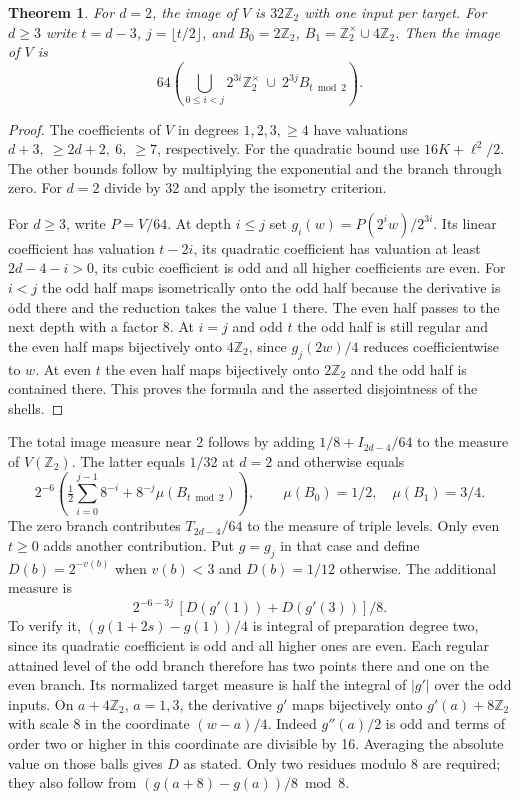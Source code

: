 \documentclass[11pt]{article}
\newtheorem{theorem}{Theorem}
\newcommand{\Z}{\mathbb Z_2}
\newcommand{\U}{\mathbb Z_2^\times}
\begin{document}
\begin{theorem}
For $d=2$, the image of $V$ is $32\Z$ with one input per target. For $d\ge3$ write $t=d-3$, $j=\lfloor t/2\rfloor$, and $B_0=2\Z$, $B_1=\U\cup4\Z$. Then the image of $V$ is
\[
 64\left(\bigcup_{0\le i<j}2^{3i}\U\ \cup\
            2^{3j} B_{t\bmod2}\right).
\]
\end{theorem}
\begin{proof}
The coefficients of $V$ in degrees $1,2,3,\ge4$ have valuations $d+3,\ \ge2d+2,\ 6,\ \ge7$, respectively. For the quadratic bound use $16K+\ell^2/2$. The other bounds follow by multiplying the exponential and the branch through zero. For $d=2$ divide by 32 and apply the isometry criterion.

For $d\ge3$, write $P=V/64$. At depth $i\le j$ set $g_i(w)=P(2^i w)/2^{3i}$. Its linear coefficient has valuation $t-2i$, its quadratic coefficient has valuation at least $2d-4-i>0$, its cubic coefficient is odd and all higher coefficients are even. For $i<j$ the odd half maps isometrically onto the odd half because the derivative is odd there and the reduction takes the value 1 there. The even half passes to the next depth with a factor 8. At $i=j$ and odd $t$ the odd half is still regular and the even half maps bijectively onto $4\Z$, since $g_j(2w)/4$ reduces coefficientwise to $w$. At even $t$ the even half maps bijectively onto $2\Z$ and the odd half is contained there. This proves the formula and the asserted disjointness of the shells.
\end{proof}
The total image measure near 2 follows by adding $1/8+I_{2d-4}/64$ to the measure of $V(\Z)$. The latter equals $1/32$ at $d=2$ and otherwise equals
\[
 2^{-6}\left(\tfrac12\sum_{i=0}^{j-1}8^{-i}
                   +8^{-j}\mu(B_{t\bmod2})\right),
 \qquad \mu(B_0)=1/2,\quad\mu(B_1)=3/4 .
\]
The zero branch contributes $T_{2d-4}/64$ to the measure of triple levels. Only even $t\ge0$ adds another contribution. Put $g=g_j$ in that case and define $D(b)=2^{-v(b)}$ when $v(b)<3$ and $D(b)=1/12$ otherwise. The additional measure is
\[
 2^{-6-3j}\,[D(g'(1))+D(g'(3))]/8 .
\]
To verify it, $(g(1+2s)-g(1))/4$ is integral of preparation degree two, since its quadratic coefficient is odd and all higher ones are even. Each regular attained level of the odd branch therefore has two points there and one on the even branch. Its normalized target measure is half the integral of $|g'|$ over the odd inputs. On $a+4\Z$, $a=1,3$, the derivative $g'$ maps bijectively onto $g'(a)+8\Z$ with scale 8 in the coordinate $(w-a)/4$. Indeed $g''(a)/2$ is odd and terms of order two or higher in this coordinate are divisible by 16. Averaging the absolute value on those balls gives $D$ as stated. Only two residues modulo 8 are required; they also follow from $(g(a+8)-g(a))/8\bmod8$.
\end{document}
